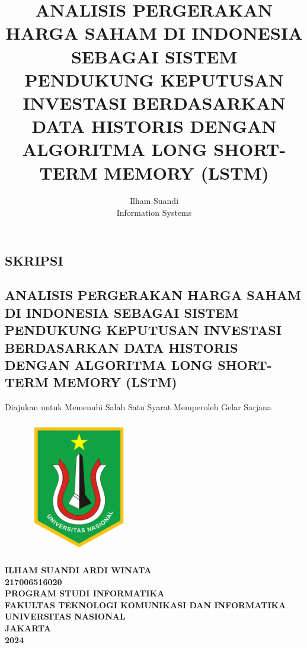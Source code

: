 \documentclass[12pt]{report}
\title{ANALISIS PERGERAKAN HARGA SAHAM DI INDONESIA SEBAGAI SISTEM PENDUKUNG KEPUTUSAN INVESTASI BERDASARKAN DATA HISTORIS DENGAN ALGORITMA LONG SHORT-TERM MEMORY (LSTM)}
\author{Ilham Suandi \\ Information Systems}
\date{}
\begin{document}
\setlength{\emergencystretch}{2em}

\onehalfspacing
\frenchspacing

\setlength{\parindent}{1cm}

\begin{titlepage}
	\thispagestyle{empty}
	\titleformat{\chapter}[hang]{\fontsize{14}{14}\centering\bfseries}{\thechapter}{}{}
	\titleformat{\section}[hang]{\fontsize{14}{14}\bfseries\centering}{\textbf{\thesection}}{1pc}{}
	\centering
	\chapter*{SKRIPSI}
	\section*{ANALISIS PERGERAKAN HARGA SAHAM DI INDONESIA SEBAGAI SISTEM PENDUKUNG KEPUTUSAN INVESTASI BERDASARKAN DATA HISTORIS DENGAN ALGORITMA LONG SHORT-TERM MEMORY (LSTM)}
	\vspace{2cm}
	Diajukan untuk Memenuhi Salah Satu Syarat Memperoleh Gelar Sarjana
	\begin{figure}[H]
		\centering
		\includegraphics[width=0.4\textwidth]{logo_unas.png}
	\end{figure}
	\textbf{ILHAM SUANDI ARDI WINATA} \\
	\textbf{217006516020} \\
	\vfill
	{\fontsize{14}{16}\selectfont \textbf{PROGRAM STUDI INFORMATIKA}} \\
	{\fontsize{13}{16}\selectfont \textbf{FAKULTAS TEKNOLOGI KOMUNIKASI DAN INFORMATIKA}} \\
	{\fontsize{13}{16}\selectfont \textbf{UNIVERSITAS NASIONAL}} \\
	{\fontsize{13}{16}\selectfont \textbf{JAKARTA}} \\
	{\fontsize{13}{16}\selectfont \textbf{2024}}
\end{titlepage}
\end{document}
